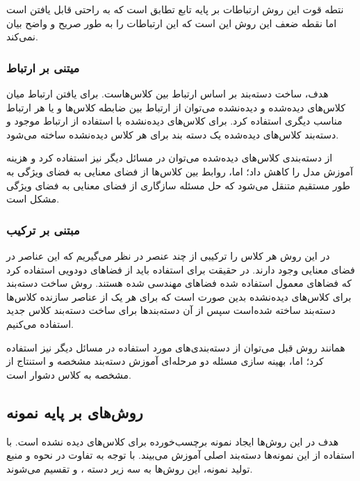 نتطه قوت این روش ارتباطات بر پایه تابع تطابق است که به راحتی قابل یافتن است اما نقطه ضعف این روش این است که این ارتباطات را به طور صریح و واضح بیان نمی‌کند.

\subsubsection{‌میتنی بر ارتباط}
هدف، ساخت دسته‌بند بر اساس ارتباط بین کلاس‌هاست. برای یافتن ارتباط میان کلاس‌های دیده‌شده و دیده‌نشده می‌توان از ارتباط بین ضابطه کلاس‌ها و یا هر ارتباط مناسب دیگری استفاده کرد. برای کلاس‌های دیده‌نشده با استفاده از ارتباط موجود و دسته‌بند کلاس‌های دیده‌شده یک دسته بند برای هر کلاس دیده‌نشده ساخته می‌شود.

از دسته‌بندی کلاس‌های دیده‌شده می‌توان در مسائل دیگر نیز استفاده کرد و هزینه آموزش مدل را کاهش داد؛ اما، روابط بین کلاس‌ها از فضای معنایی به فضای ویژگی به طور مستقیم متنقل می‌شود که حل مسئله سازگاری از فضای معنایی به فضای ویژگی مشکل است.

\subsubsection{مبتنی بر ترکیب‌}
در این روش هر کلاس را ترکیبی از چند عنصر در نظر می‌گیریم که این عناصر در فضای معنایی وجود دارند. در حقیقت برای استفاده باید از فضاهای دودویی استفاده کرد که فضاهای معمول استفاده شده فضاهای مهندسی شده هستند. روش ساخت دسته‌بند برای کلاس‌های دیده‌نشده بدین صورت است که برای هر یک از عناصر سازنده کلاس‌ها دسته‌بند ساخته شده‌‌است سپس از آن دسته‌بند‌ها برای ساخت دسته‌بند کلاس جدید استفاده می‌کنیم.

همانند روش قبل می‌توان از دسته‌بندی‌های مورد استفاده در مسائل دیگر نیز استفاده کرد؛ اما، بهینه سازی مسئله دو مرحله‌ای آموزش دسته‌بند مشخصه و استنتاج از مشخصه به کلاس دشوار است.

\subsection{روش‌‌های بر پایه نمونه}
هدف در این روش‌‌ها ایجاد نمونه برچسب‌خورده برای کلاس‌های دیده نشده است. با استفاده از این نمونه‌ها دسته‌بند اصلی آموزش می‌بیند. با توجه به تفاوت در نحوه و منبع تولید نمونه،‌ این روش‌‌ها به سه زیر دسته
،
 و
تقسیم می‌شوند.

